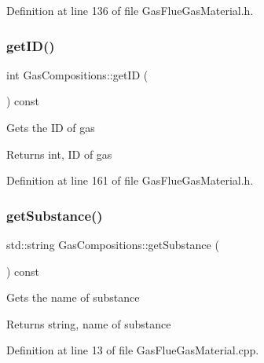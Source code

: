 Definition at line 136 of file Gas\+Flue\+Gas\+Material.\+h.

\mbox{\label{class_gas_compositions_a9668decdb2b5065c8ee3c59c207b9d51}} 
\subsubsection{\texorpdfstring{get\+I\+D()}{getID()}}
{\footnotesize\ttfamily int Gas\+Compositions\+::get\+ID (\begin{DoxyParamCaption}{ }\end{DoxyParamCaption}) const\hspace{0.3cm}{\ttfamily [inline]}}

Gets the ID of gas

\begin{DoxyReturn}{Returns}
int, ID of gas 
\end{DoxyReturn}


Definition at line 161 of file Gas\+Flue\+Gas\+Material.\+h.

\mbox{\label{class_gas_compositions_abad9554bca9b68cd970eae11bdd3c505}} 
\subsubsection{\texorpdfstring{get\+Substance()}{getSubstance()}}
{\footnotesize\ttfamily std\+::string Gas\+Compositions\+::get\+Substance (\begin{DoxyParamCaption}{ }\end{DoxyParamCaption}) const}

Gets the name of substance

\begin{DoxyReturn}{Returns}
string, name of substance 
\end{DoxyReturn}


Definition at line 13 of file Gas\+Flue\+Gas\+Material.\+cpp.

\mbox{\label{class_gas_compositions_a9fc3ebfcbda7134b67ed76a39b4c94cc}} 
